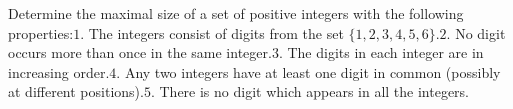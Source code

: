 Determine the maximal size of a set of positive integers with the following properties:$1.$ The integers consist of digits from the set $\{ 1,2,3,4,5,6\}$.$2.$ No digit occurs more than once in the same integer.$3.$ The digits in each integer are in increasing order.$4.$ Any two integers have at least one digit in common (possibly at different positions).$5.$ There is no digit which appears in all the integers.